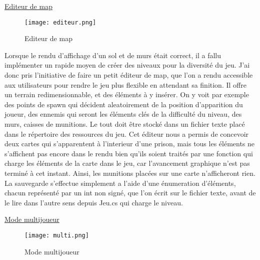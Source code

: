 \documentclass{article}
\begin{document}
\newpage
\underline{Editeur de map}

\begin{figure}[h]
\begin{center}
\texttt{[image: editeur.png]}
\caption{Editeur de map}
\end{center}
\end{figure}


\par
Lorsque le rendu d’affichage d’un sol et de murs était correct, il a fallu implémenter un rapide moyen de créer des niveaux pour la diversité du jeu. J’ai donc pris l’initiative de faire un petit éditeur de map, que l’on a rendu accessible aux utilisateurs pour rendre le jeu plus flexible en attendant sa finition. Il offre un terrain redimensionnable, et des éléments à y insérer. On y voit par exemple des points de spawn qui décident aleatoirement de la position d’apparition du joueur, des ennemis qui seront les éléments clés de la difficulté du niveau, des murs, caisses de munitions. Le tout doit être stocké dans un fichier texte placé dans le répertoire des ressources du jeu. Cet éditeur nous a permis de concevoir deux cartes qui s’apparentent à l’interieur d’une prison, mais tous les éléments ne s’affichent pas encore dans le rendu bien qu’ils soient traités par une fonction qui charge les éléments de la carte dans le jeu, car l’avancement graphique n’est pas terminé à cet instant. Ainsi, les munitions placées sur une carte n’afficheront rien. La sauvegarde s’effectue simplement a l’aide d’une énumeration d’éléments, chacun représenté par un int non signé, que l’on écrit sur le fichier texte, avant de le lire dans l’autre sens depuis Jeu.cs qui charge le niveau.
\newline
\newpage

\underline{Mode multijoueur}

\begin{figure}[h]
\begin{center}
\texttt{[image: multi.png]}
\caption{Mode multijoueur}
\end{center}
\end{figure}
\end{document}
